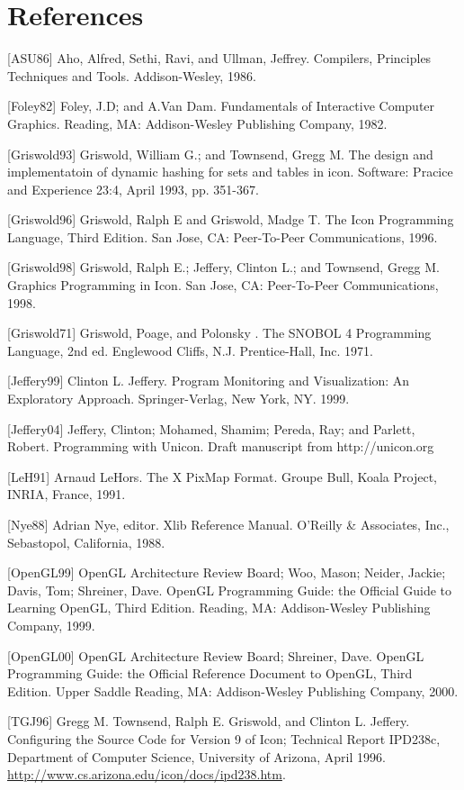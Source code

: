 \clearpage\section{References}

[ASU86] Aho, Alfred, Sethi, Ravi, and Ullman, Jeffrey. Compilers,
Principles Techniques and Tools. Addison-Wesley, 1986.

[Foley82] Foley, J.D; and A.Van Dam. Fundamentals of Interactive
Computer Graphics. Reading, MA: Addison-Wesley Publishing Company,
1982.

[Griswold93] Griswold, William G.; and Townsend, Gregg M.
The design and implementatoin of dynamic hashing for sets
and tables in icon. Software: Pracice and Experience 23:4,
April 1993, pp. 351-367.

[Griswold96] Griswold, Ralph E and Griswold, Madge T. The Icon
Programming Language, Third Edition. San Jose, CA: Peer-To-Peer
Communications, 1996.

[Griswold98] Griswold, Ralph E.; Jeffery, Clinton L.; and Townsend,
Gregg M. Graphics Programming in Icon. San Jose, CA: Peer-To-Peer
Communications, 1998.

[Griswold71] Griswold, Poage, and Polonsky . The SNOBOL 4 Programming
Language, 2nd ed. Englewood Cliffs, N.J.  Prentice-Hall, Inc. 1971.

[Jeffery99] Clinton L. Jeffery. Program Monitoring and Visualization:
An Exploratory Approach.  Springer-Verlag, New York, NY. 1999.

[Jeffery04] Jeffery, Clinton; Mohamed, Shamim; Pereda, Ray; and
Parlett, Robert. Programming with Unicon. Draft manuscript from
http://unicon.org

[LeH91] Arnaud LeHors. The X PixMap Format. Groupe Bull, Koala
Project, INRIA, France, 1991.

[Nye88] Adrian Nye, editor. Xlib Reference Manual. O'Reilly \&
Associates, Inc., Sebastopol, California, 1988.

[OpenGL99] OpenGL Architecture Review Board; Woo, Mason; Neider,
Jackie; Davis, Tom; Shreiner, Dave. OpenGL Programming Guide: the
Official Guide to Learning OpenGL, Third Edition. Reading, MA:
Addison-Wesley Publishing Company, 1999.

[OpenGL00] OpenGL Architecture Review Board; Shreiner, Dave. OpenGL
Programming Guide: the Official Reference Document to OpenGL, Third
Edition. Upper Saddle Reading, MA: Addison-Wesley Publishing Company,
2000.

[TGJ96] Gregg M. Townsend, Ralph E. Griswold, and Clinton
L. Jeffery. Configuring the Source Code for Version 9 of Icon;
Technical Report IPD238c, Department of Computer Science, University
of Arizona, April 1996.\newline
\url{http://www.cs.arizona.edu/icon/docs/ipd238.htm}.

